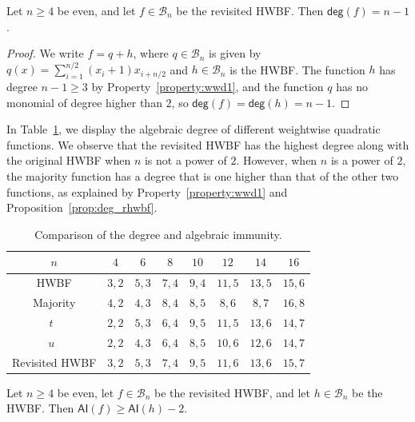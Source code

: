 \documentclass[runningheads,orivec]{llncs}
\newcommand{\AI}{\mathsf{AI}}
\newcommand{\BN}{\mathcal{B}_n}
\newcommand{\degg}{\mathsf{deg}}
\newcommand{\hwbf}{\textsf{HWBF}}
\let\geq=\geqslant
\begin{document}
    \begin{proposition}\label{prop:deg_rhwbf}
    	Let $n\geq 4$ be even, and let $f\in\BN$ be the revisited \hwbf{}. Then $\degg(f)=n-1$.
    \end{proposition}
    \begin{proof}
    	We write $f=q+h$, where $q\in\BN$ is given by $q(x)=\sum_{i=1}^{n/2} (x_i+1) x_{i+n/2}$ and $h\in\BN$ is the \hwbf{}. The function $h$ has degree $n-1\geq 3$ by Property~\ref{property:wwd1}, and the function $q$ has no monomial of degree higher than $2$, so $\degg(f)=\degg(h)=n-1$.
    \end{proof}
    
    In Table~\ref{table:comparisonsDegAI}, we display the algebraic degree of different weightwise quadratic functions. We observe that the revisited \hwbf{} has the highest degree along with the original \hwbf{} when $n$ is not a power of $2$. However, when $n$ is a power of $2$, the majority function has a degree that is one higher than that of the other two functions, as explained by Property~\ref{property:wwd1} and Proposition~\ref{prop:deg_rhwbf}.
    
    \begin{table}
    	\scriptsize
    	\centering
        \caption{Comparison of the degree and algebraic immunity.}
    	\label{table:comparisonsDegAI}
    	\begin{tabular}{|c|c|c|c|c|c|c|c|}
    		\hline
            $n$&$4$&$6$&$8$&$10$&$12$&$14$&$16$\\
            \hline
            \hwbf{}&$3,2$&$5,3$&$7,4$&$9,4$&$11,5$&$13,5$&$15,6$\\  	
            Majority&$4,2$&$4,3$&$8,4$&$8,5$&$8,6$&$8,7$&$16,8$\\
            $t$~\cite{DAM:MeaOza24}&$2,2$&$5,3$&$6,4$&$9,5$&$11,5$&$13,6$&$14,7$\\
            $u$~\cite{DAM:MeaOza24}&$2,2$&$4,3$&$6,4$&$8,5$&$10,6$&$12,6$&$14,7$\\
            Revisited \hwbf{}&$3,2$&$5,3$&$7,4$&$9,5$&$11,6$&$13,6$&$15,7$\\
    		\hline
    	\end{tabular}
    \end{table}
    
    \begin{proposition}
    	Let $n\geq 4$ be even, let $f\in\BN$ be the revisited \hwbf{}, and let $h\in\BN$ be the \hwbf{}. Then $\AI(f)\geq \AI(h)-2$.
    \end{proposition}
    
\end{document}
